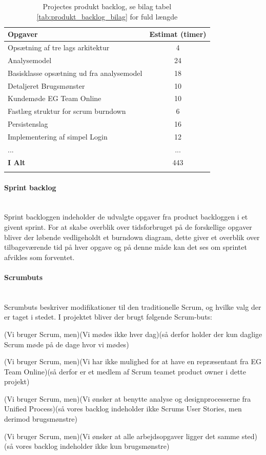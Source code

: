 \documentclass[../../main.tex]{subfiles}
\begin{document}
\begin{center}
   \small
   \begin{longtable}{| l | c |}
    \hline
    \textbf{Opgaver}												 & \textbf{Estimat (timer)} \\ \hline
    Opsætning af tre lags arkitektur							     & 4  \\ \hline
    Analysemodel													 & 24 \\ \hline
    Basisklasse opsætning ud fra analysemodel						 & 18 \\ \hline
    Detaljeret Brugsmønster											 & 10 \\ \hline
    Kundemøde EG Team Online										 & 10 \\ \hline
    Fastlæg struktur for scrum burndown								 & 6  \\ \hline
    Persistenslag							 	 					 & 16 \\ \hline
    Implementering af simpel Login									 & 12 \\ \hline
	...																 & ... \\ \hline
    \textbf{I Alt}													 & 443 \\ \hline
    \caption{Projectes produkt backlog, se bilag tabel \ref{tab:produkt_backlog_bilag} for fuld længde}
    \label{tab:produkt_backlog}
    \end{longtable}
\end{center}

\paragraph{Sprint backlog}\mbox{} \\
Sprint backloggen indeholder de udvalgte opgaver fra product backloggen i et givent sprint. For at skabe overblik over tidsforbruget på de forskellige opgaver bliver der løbende vedligeholdt et burndown diagram, dette giver et overblik over tilbageværende tid på hver opgave og på denne måde kan det ses om sprintet afvikles som forventet.

\paragraph{Scrumbuts} \label{Scrum-buts} \mbox{}\\
Scrumbuts beskriver modifikationer til den traditionelle Scrum, og hvilke valg der er taget i stedet.
I projektet bliver der brugt følgende Scrum-buts:

(Vi bruger Scrum, men)(Vi mødes ikke hver dag)(så derfor holder der kun daglige Scrum møde på de dage hvor vi mødes) 

(Vi bruger Scrum, men)(Vi har ikke mulighed for at have en repræsentant fra EG Team Online)(så derfor er et medlem af Scrum teamet product owner i dette projekt)

(Vi bruger Scrum, men)(Vi ønsker at benytte analyse og designprocesserne fra Unified Process)(så vores backlog indeholder ikke Scrums User Stories, men derimod brugsmønstre)  

(Vi bruger Scrum, men)(Vi ønsker at alle arbejdsopgaver ligger det samme sted)(så vores backlog indeholder ikke kun brugsmønstre)  
\end{document}
